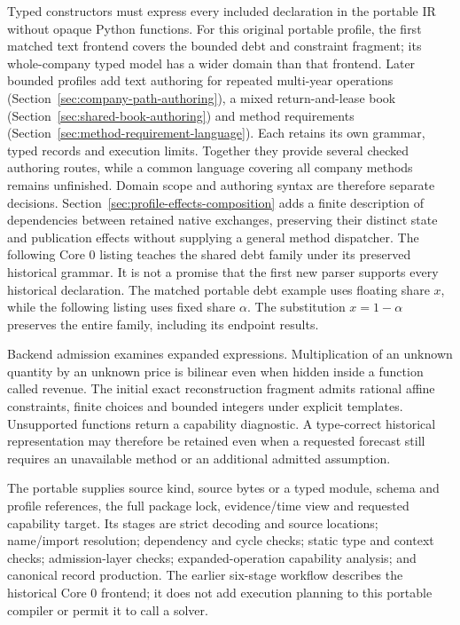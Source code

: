 Typed constructors must express every included declaration in the portable IR
without opaque Python functions. For this original portable profile, the first
matched text frontend covers the bounded debt and constraint fragment; its
whole-company typed model has a wider domain than that frontend. Later bounded
profiles add text authoring for repeated multi-year operations
(Section~\ref{sec:company-path-authoring}), a mixed return-and-lease book
(Section~\ref{sec:shared-book-authoring}) and method requirements
(Section~\ref{sec:method-requirement-language}). Each retains its own grammar,
typed records and execution limits. Together they provide several checked
authoring routes, while a common language covering all company methods remains
unfinished. Domain scope and authoring syntax are therefore separate decisions.
Section~\ref{sec:profile-effects-composition} adds a finite description of
dependencies between retained native exchanges, preserving their distinct state
and publication effects without supplying a general method dispatcher.
The following Core 0 listing teaches the shared debt family under its preserved
historical grammar. It is not a promise that the first new parser supports every
historical declaration.
The matched portable debt example uses floating share $x$, while the following
listing uses fixed share $\alpha$. The substitution $x=1-\alpha$ preserves
the entire family, including its endpoint results.

Backend admission examines expanded expressions. Multiplication of an unknown
quantity by an unknown price is bilinear even when hidden inside a function
called revenue. The initial exact reconstruction fragment admits rational affine
constraints, finite choices and bounded integers under explicit templates.
Unsupported functions return a capability diagnostic. A type-correct historical
representation may therefore be retained even when a requested forecast still
requires an unavailable method or an additional admitted assumption.

The portable  supplies source kind, source bytes or a typed
module, schema and profile references, the full package lock, evidence/time view
and requested capability target. Its stages are strict decoding and source
locations; name/import resolution; dependency and cycle checks; static type and
context checks; admission-layer checks; expanded-operation capability analysis;
and canonical record production. The earlier six-stage workflow describes the
historical Core 0 frontend; it does not add execution planning to this portable
compiler or permit it to call a solver.

